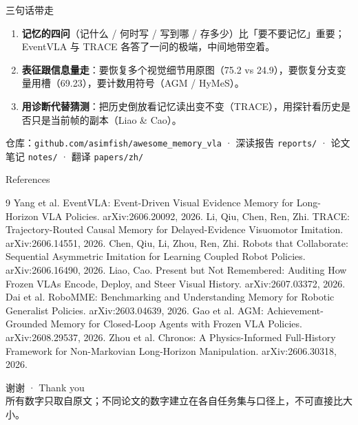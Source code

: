 \documentclass[aspectratio=169,10pt]{beamer}
\begin{document}
\begin{frame}{三句话带走}
\begin{enumerate}
\item \textbf{记忆的四问}（记什么 / 何时写 / 写到哪 / 存多少）比「要不要记忆」重要；EventVLA 与 TRACE 各答了一问的极端，中间地带空着。
\item \textbf{表征跟信息量走}：要恢复多个视觉细节用原图（75.2 vs 24.9），要恢复分支变量用槽（69.23），要计数用符号（AGM / HyMeS）。
\item \textbf{用诊断代替猜测}：把历史倒放看记忆读出变不变（TRACE），用探针看历史是否只是当前帧的副本（Liao \& Cao）。
\end{enumerate}
\vspace{6pt}
\begin{center}
\small 仓库：\texttt{github.com/asimfish/awesome\_memory\_vla} · 深读报告 \texttt{reports/} · 论文笔记 \texttt{notes/} · 翻译 \texttt{papers/zh/}
\end{center}
\end{frame}

\begin{frame}{References}
\small
\begin{thebibliography}{9}
 Yang et al. EventVLA: Event-Driven Visual Evidence Memory for Long-Horizon VLA Policies. arXiv:2606.20092, 2026.
 Li, Qiu, Chen, Ren, Zhi. TRACE: Trajectory-Routed Causal Memory for Delayed-Evidence Visuomotor Imitation. arXiv:2606.14551, 2026.
 Chen, Qiu, Li, Zhou, Ren, Zhi. Robots that Collaborate: Sequential Asymmetric Imitation for Learning Coupled Robot Policies. arXiv:2606.16490, 2026.
 Liao, Cao. Present but Not Remembered: Auditing How Frozen VLAs Encode, Deploy, and Steer Visual History. arXiv:2607.03372, 2026.
 Dai et al. RoboMME: Benchmarking and Understanding Memory for Robotic Generalist Policies. arXiv:2603.04639, 2026.
 Gao et al. AGM: Achievement-Grounded Memory for Closed-Loop Agents with Frozen VLA Policies. arXiv:2608.29537, 2026.
 Zhou et al. Chronos: A Physics-Informed Full-History Framework for Non-Markovian Long-Horizon Manipulation. arXiv:2606.30318, 2026.
\end{thebibliography}
\end{frame}

\begin{frame}
\begin{center}
{\Large 谢谢 · Thank you}\\[8pt]
\small 所有数字只取自原文；不同论文的数字建立在各自任务集与口径上，不可直接比大小。
\end{center}
\end{frame}
\end{document}
